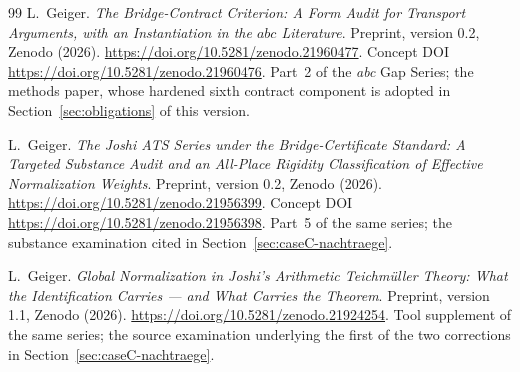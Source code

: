 \documentclass[11pt,a4paper]{article}
\theoremstyle{definition}
\begin{document}
\begin{thebibliography}{99}
L.~Geiger.
\newblock \emph{The Bridge-Contract Criterion: A Form Audit for Transport
Arguments, with an Instantiation in the $abc$ Literature}.
\newblock Preprint, version 0.2, Zenodo (2026).
\newblock \url{https://doi.org/10.5281/zenodo.21960477}.
\newblock Concept DOI \url{https://doi.org/10.5281/zenodo.21960476}.
\newblock Part~2 of the \emph{abc} Gap Series; the methods paper, whose hardened
sixth contract component is adopted in Section~\ref{sec:obligations} of this
version.

L.~Geiger.
\newblock \emph{The Joshi ATS Series under the Bridge-Certificate Standard: A
Targeted Substance Audit and an All-Place Rigidity Classification of Effective
Normalization Weights}.
\newblock Preprint, version 0.2, Zenodo (2026).
\newblock \url{https://doi.org/10.5281/zenodo.21956399}.
\newblock Concept DOI \url{https://doi.org/10.5281/zenodo.21956398}.
\newblock Part~5 of the same series; the substance examination cited in
Section~\ref{sec:caseC-nachtraege}.

L.~Geiger.
\newblock \emph{Global Normalization in Joshi's Arithmetic Teichmüller Theory:
What the Identification Carries --- and What Carries the Theorem}.
\newblock Preprint, version 1.1, Zenodo (2026).
\newblock \url{https://doi.org/10.5281/zenodo.21924254}.
\newblock Tool supplement of the same series; the source examination underlying the
first of the two corrections in Section~\ref{sec:caseC-nachtraege}.

\end{thebibliography}
\end{document}

